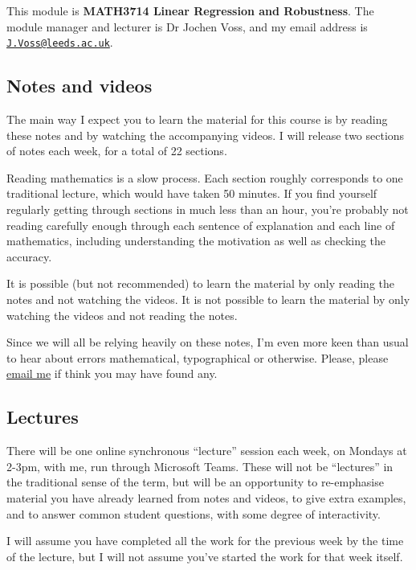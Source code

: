 \documentclass[
  a4paper,
]{article}
\theoremstyle{definition}
\theoremstyle{definition}
\theoremstyle{definition}
\theoremstyle{definition}
\theoremstyle{remark}
\begin{document}
This module is \textbf{MATH3714 Linear Regression and Robustness}. The
module manager and lecturer is Dr Jochen Voss, and my email address is
\href{mailto:J.Voss@leeds.ac.uk}{\nolinkurl{J.Voss@leeds.ac.uk}}.

\hypertarget{notes}{%
\subsection*{Notes and videos}\label{notes}}

The main way I expect you to learn the material for this course is by
reading these notes and by watching the accompanying videos. I will
release two sections of notes each week, for a total of 22 sections.

Reading mathematics is a slow process. Each section roughly
corresponds to one traditional lecture, which would have taken 50
minutes. If you find yourself regularly getting through sections in
much less than an hour, you're probably not reading carefully enough
through each sentence of explanation and each line of mathematics,
including understanding the motivation as well as checking the
accuracy.

It is possible (but not recommended) to learn the material by only
reading the notes and not watching the videos. It is not possible to
learn the material by only watching the videos and not reading the
notes.

Since we will all be relying heavily on these notes, I'm even more
keen than usual to hear about errors mathematical, typographical or
otherwise. Please, please \href{mailto:J.Voss@leeds.ac.uk}{email me} if
think you may have found any.

\hypertarget{lectures}{%
\subsection*{Lectures}\label{lectures}}

There will be one online synchronous ``lecture'' session each week, on
Mondays at 2-3pm, with me, run through Microsoft Teams. These will
not be ``lectures'' in the traditional sense of the term, but will be an
opportunity to re-emphasise material you have already learned from
notes and videos, to give extra examples, and to answer common student
questions, with some degree of interactivity.

I will assume you have completed all the work for the previous week by
the time of the lecture, but I will not assume you've started the work
for that week itself.
\end{document}
